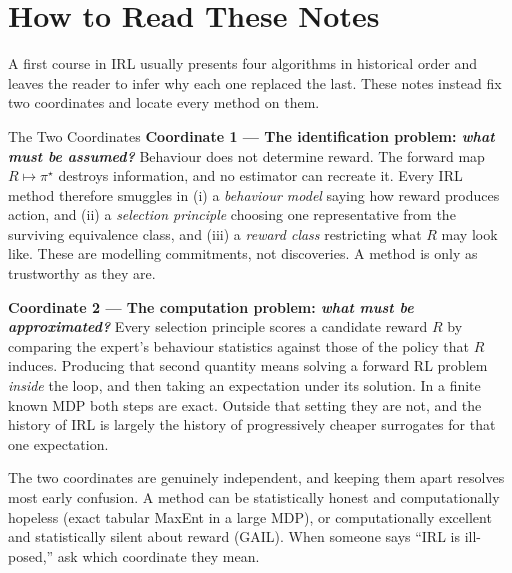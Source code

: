 \documentclass[11pt]{article}
\theoremstyle{plain}
\theoremstyle{definition}
\theoremstyle{remark}
\begin{document}
\section*{How to Read These Notes}

A first course in IRL usually presents four algorithms in historical order
and leaves the reader to infer why each one replaced the last. These notes
instead fix two coordinates and locate every method on them.

\begin{graybox}{The Two Coordinates}
\textbf{Coordinate 1 --- The identification problem: \emph{what must be
assumed?}}
Behaviour does not determine reward. The forward map $R \mapsto \pi^\star$
destroys information, and no estimator can recreate it. Every IRL method
therefore smuggles in (i) a \emph{behaviour model} saying how reward
produces action, and (ii) a \emph{selection principle} choosing one
representative from the surviving equivalence class, and (iii) a
\emph{reward class} restricting what $R$ may look like. These are modelling
commitments, not discoveries. A method is only as trustworthy as they are.

\medskip
\textbf{Coordinate 2 --- The computation problem: \emph{what must be
approximated?}}
Every selection principle scores a candidate reward $R$ by comparing the
expert's behaviour statistics against those of the policy that $R$ induces.
Producing that second quantity means solving a forward RL problem
\emph{inside} the loop, and then taking an expectation under its solution.
In a finite known MDP both steps are exact. Outside that setting they are
not, and the history of IRL is largely the history of progressively
cheaper surrogates for that one expectation.
\end{graybox}

The two coordinates are genuinely independent, and keeping them apart
resolves most early confusion. A method can be statistically honest and
computationally hopeless (exact tabular MaxEnt in a large MDP), or
computationally excellent and statistically silent about reward (GAIL).
When someone says ``IRL is ill-posed,'' ask which coordinate they mean.
\end{document}
